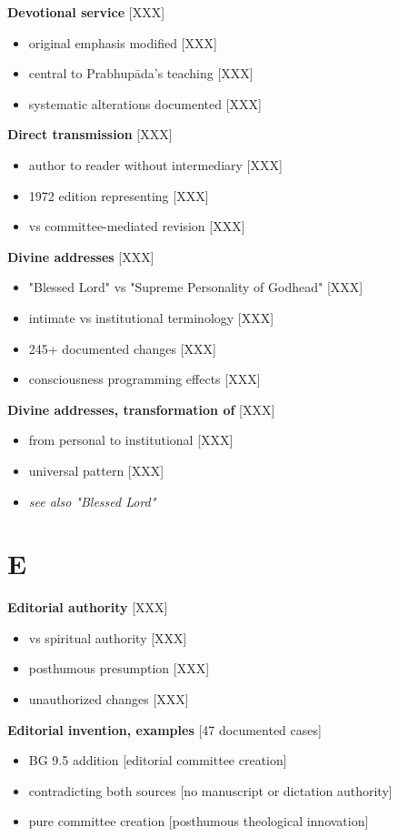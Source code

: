 \documentclass[11pt,twoside]{book}
\begin{document}
\textbf{\textbf{Devotional service}} {[}XXX]
\begin{itemize}
\item original emphasis modified [XXX]
\item central to Prabhupāda's teaching [XXX]
\item systematic alterations documented [XXX]
\end{itemize}

\textbf{\textbf{Direct transmission}} {[}XXX]
\begin{itemize}
\item author to reader without intermediary [XXX]
\item 1972 edition representing [XXX]
\item vs committee-mediated revision [XXX]
\end{itemize}

\textbf{\textbf{Divine addresses}} {[}XXX]
\begin{itemize}
\item "Blessed Lord" vs "Supreme Personality of Godhead" [XXX]
\item intimate vs institutional terminology [XXX]
\item 245+ documented changes [XXX]
\item consciousness programming effects [XXX]
\end{itemize}

\textbf{\textbf{Divine addresses, transformation of}} {[}XXX]
\begin{itemize}
\item from personal to institutional [XXX]
\item universal pattern [XXX]
\item \emph{see also "Blessed Lord"}
\end{itemize}
\section*{E}
\label{sec:orgfa1feee}

\textbf{\textbf{Editorial authority}} {[}XXX]
\begin{itemize}
\item vs spiritual authority [XXX]
\item posthumous presumption [XXX]
\item unauthorized changes [XXX]
\end{itemize}

\textbf{\textbf{Editorial invention, examples}} {[}47 documented cases]
\begin{itemize}
\item BG 9.5 addition [editorial committee creation]
\item contradicting both sources [no manuscript or dictation authority]
\item pure committee creation [posthumous theological innovation]
\end{itemize}
\end{document}
